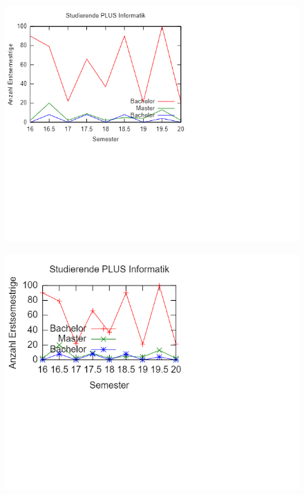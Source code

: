 \documentclass[12pt,fleqn]{article}
\begin{document}
	\begin{figure}[H]
		\includegraphics[scale = 1.125]{1.png}
	\end{figure}
	\begin{figure}[H]
		\includegraphics[scale = 1.125]{2.png}
	\end{figure}
\end{document}
